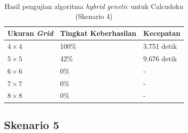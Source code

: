 \begin{table}
\centering
\captionsetup{justification=centering}
\caption[Hasil pengujian algoritma \textit{hybrid genetic} untuk Calcudoku (Skenario 4)]{Hasil pengujian algoritma \textit{hybrid genetic} untuk Calcudoku (Skenario 4)}
\begin{tabular}{| l | l | l |}
\hline
Ukuran \textit{Grid} & Tingkat Keberhasilan & Kecepatan \\
\hline \hline
\begin{math}4 \times 4\end{math} & 100\% & 3.751 detik \\
\hline
\begin{math}5 \times 5\end{math} & 42\% & 9.676 detik \\
\hline
\begin{math}6 \times 6\end{math} & 0\% & - \\
\hline
\begin{math}7 \times 7\end{math} & 0\% & - \\
\hline
\begin{math}8 \times 8\end{math} & 0\% & - \\
\hline
\end{tabular}
\label{tab:pengujianhg4}
\end{table}

\subsection{Skenario 5}
\label{sec:skenario5}

